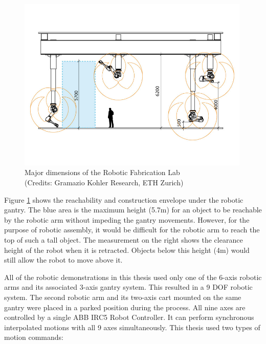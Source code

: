 \begin{figure}
    \centering
    \includegraphics[width=0.99\textwidth]{images/05/image47.png}
    \caption[Major dimensions of the Robotic Fabrication Lab]
    {Major dimensions of the Robotic Fabrication Lab\\
    \footnotesize{(Credits: Gramazio Kohler Research, ETH Zurich)}}
    \label{fig:robotic-fabrication-laboratory-dimensions}
\end{figure}

Figure \ref{fig:robotic-fabrication-laboratory-dimensions} shows the reachability and construction envelope under the robotic gantry. The blue area is the maximum height (5.7m) for an object to be reachable by the robotic arm without impeding the gantry movements. However, for the purpose of robotic assembly, it would be difficult for the robotic arm to reach the top of such a tall object. The measurement on the right shows the clearance height of the robot when it is retracted. Objects below this height (4m) would still allow the robot to move above it. 



All of the robotic demonstrations in this thesis used only one of the 6-axis robotic arms and its associated 3-axis gantry system. This resulted in a 9 DOF robotic system. The second robotic arm and its two-axis cart mounted on the same gantry were placed in a parked position during the process.
All nine axes are controlled by a single ABB IRC5 Robot Controller. It can perform synchronous interpolated motions with all 9 axes simultaneously. This thesis used two types of motion commands: 

